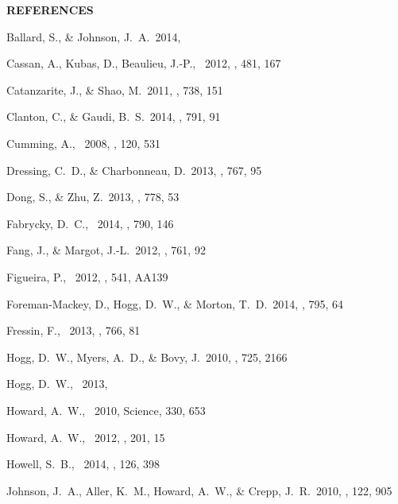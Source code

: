 \documentclass[letterpaper,12pt,preprint]{hack_aastex}
\begin{document}
\begin{multicols}{2}
{\centering\bf REFERENCES\par}
\vspace{0.2em}
\begin{thebibliography}{}%
\raggedright\raggedbottom\scriptsize\setlength{\parskip}{-0.5em}%

Ballard, S., \& Johnson, J.~A.\ 2014, 

Cassan, A., Kubas, D., Beaulieu, J.-P., \etal\ 2012, \nat, 481, 167

Catanzarite, J., \& Shao, M.\ 2011, \apj, 738, 151

Clanton, C., \& Gaudi, B.~S.\ 2014, \apj, 791, 91

Cumming, A., \etal\ 2008, \pasp, 120, 531

Dressing, C.~D., \& Charbonneau, D.\ 2013, \apj, 767, 95

Dong, S., \& Zhu, Z.\ 2013, \apj, 778, 53

Fabrycky, D.~C., \etal\ 2014, \apj, 790, 146

Fang, J., \& Margot, J.-L.\ 2012, \apj, 761, 92

Figueira, P., \etal\ 2012, \aap, 541, AA139

Foreman-Mackey, D., Hogg, D.~W., \& Morton, T.~D.\ 2014, \apj, 795, 64

Fressin, F., \etal\ 2013, \apj, 766, 81

Hogg, D.~W., Myers, A.~D., \& Bovy, J.\ 2010, \apj, 725, 2166

Hogg, D.~W., \etal\ 2013, 

Howard, A.~W., \etal\ 2010, Science, 330, 653

Howard, A.~W., \etal\ 2012, \apjs, 201, 15

Howell, S.~B., \etal\ 2014, \pasp, 126, 398

Johnson, J.~A., Aller, K.~M., Howard, A.~W., \& Crepp, J.~R.\ 2010, \pasp,
122, 905


\end{thebibliography}
\end{multicols}
\end{document}
